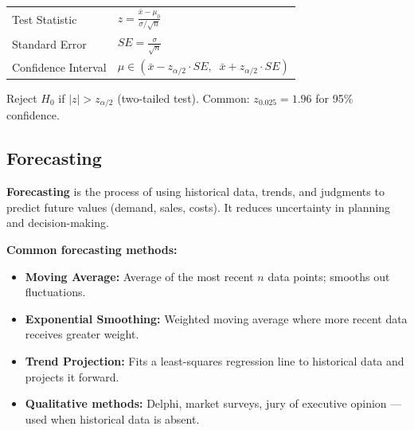 \documentclass[12pt,a4paper]{article}
\renewcommand{\arraystretch}{1.45}
\begin{document}
\begin{tcolorbox}[formulabox, title={\textbf{Hypothesis Testing --- Z-test for Population Mean}}]
\renewcommand{\arraystretch}{1.3}
\begin{tabularx}{\linewidth}{B{4.0cm} X}Test Statistic & $\displaystyle z = \frac{\bar{x} - \mu_0}{\sigma / \sqrt{n}}$ \\[8pt]
Standard Error & $\displaystyle SE = \frac{\sigma}{\sqrt{n}}$ \\[8pt]
Confidence Interval & $\displaystyle \mu \in \left(\bar{x} - z_{\alpha/2} \cdot SE,\;\; \bar{x} + z_{\alpha/2} \cdot SE\right)$
\end{tabularx}
\par\vspace{4pt}
Reject $H_0$ if $|z| > z_{\alpha/2}$ (two-tailed test). Common: $z_{0.025} = 1.96$ for 95\% confidence.
\end{tcolorbox}

\subsection{Forecasting}

\begin{tcolorbox}[defbox, title={\textbf{Forecasting}}]
\textbf{Forecasting} is the process of using historical data, trends, and judgments to predict future values (demand, sales, costs). It reduces uncertainty in planning and decision-making.
\end{tcolorbox}

\textbf{Common forecasting methods:}
\begin{itemize}[leftmargin=*, itemsep=2pt]
  \item \textbf{Moving Average:} Average of the most recent $n$ data points; smooths out fluctuations.
  \item \textbf{Exponential Smoothing:} Weighted moving average where more recent data receives greater weight.
  \item \textbf{Trend Projection:} Fits a least-squares regression line to historical data and projects it forward.
  \item \textbf{Qualitative methods:} Delphi, market surveys, jury of executive opinion --- used when historical data is absent.
\end{itemize}
\end{document}
